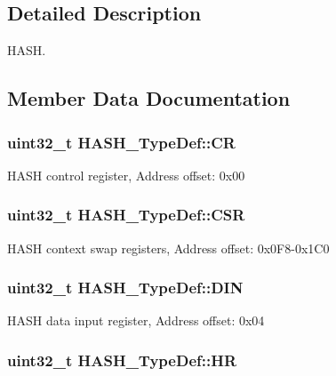 \subsection{Detailed Description}
H\-A\-S\-H. 

\subsection{Member Data Documentation}
\hypertarget{struct_h_a_s_h___type_def_adba940f3265121b77f9304b1843010ea}{
\subsubsection[{C\-R}]{ uint32\-\_\-t H\-A\-S\-H\-\_\-\-Type\-Def\-::\-C\-R}}\label{struct_h_a_s_h___type_def_adba940f3265121b77f9304b1843010ea}
H\-A\-S\-H control register, Address offset\-: 0x00 \hypertarget{struct_h_a_s_h___type_def_a6d9958409436502910d446daa32dedf5}{
\subsubsection[{C\-S\-R}]{ uint32\-\_\-t H\-A\-S\-H\-\_\-\-Type\-Def\-::\-C\-S\-R}}\label{struct_h_a_s_h___type_def_a6d9958409436502910d446daa32dedf5}
H\-A\-S\-H context swap registers, Address offset\-: 0x0\-F8-\/0x1\-C0 \hypertarget{struct_h_a_s_h___type_def_ac4f283960465f7a1d318ed66d4b88f74}{
\subsubsection[{D\-I\-N}]{ uint32\-\_\-t H\-A\-S\-H\-\_\-\-Type\-Def\-::\-D\-I\-N}}\label{struct_h_a_s_h___type_def_ac4f283960465f7a1d318ed66d4b88f74}
H\-A\-S\-H data input register, Address offset\-: 0x04 \hypertarget{struct_h_a_s_h___type_def_a4788d8786be90fd9e71fbd8a5e03a115}{
\subsubsection[{H\-R}]{ uint32\-\_\-t H\-A\-S\-H\-\_\-\-Type\-Def\-::\-H\-R}}\label{struct_h_a_s_h___type_def_a4788d8786be90fd9e71fbd8a5e03a115}
